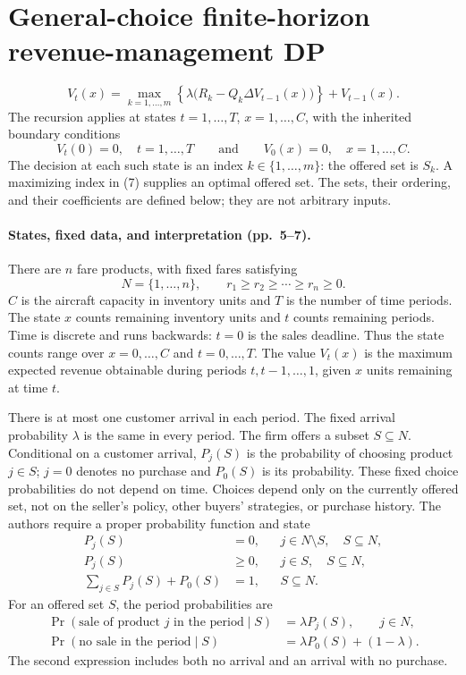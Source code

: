 \documentclass{article}
\begin{document}
\section*{General-choice finite-horizon revenue-management DP}

\begin{equation}
V_t(x)=\max_{k=1,\ldots,m}
\left\{\lambda\bigl(R_k-Q_k\Delta V_{t-1}(x)\bigr)\right\}
+V_{t-1}(x).
\tag{7}
\end{equation}
The recursion applies at states $t=1,\ldots,T$, $x=1,\ldots,C$, with the inherited boundary conditions
\begin{equation}
V_t(0)=0,\quad t=1,\ldots,T
\qquad\text{and}\qquad
V_0(x)=0,\quad x=1,\ldots,C.
\tag{2}
\end{equation}
The decision at each such state is an index $k\in\{1,\ldots,m\}$: the offered set is $S_k$. A maximizing index in (7) supplies an optimal offered set. The sets, their ordering, and their coefficients are defined below; they are not arbitrary inputs.

\paragraph{States, fixed data, and interpretation (pp.~5--7).}
There are $n$ fare products, with fixed fares satisfying
\[
N=\{1,\ldots,n\},
\qquad r_1\ge r_2\ge\cdots\ge r_n\ge0.
\]
$C$ is the aircraft capacity in inventory units and $T$ is the number of time periods. The state $x$ counts remaining inventory units and $t$ counts remaining periods. Time is discrete and runs backwards: $t=0$ is the sales deadline. Thus the state counts range over $x=0,\ldots,C$ and $t=0,\ldots,T$. The value $V_t(x)$ is the maximum expected revenue obtainable during periods $t,t-1,\ldots,1$, given $x$ units remaining at time $t$.

There is at most one customer arrival in each period. The fixed arrival probability $\lambda$ is the same in every period. The firm offers a subset $S\subseteq N$. Conditional on a customer arrival, $P_j(S)$ is the probability of choosing product $j\in S$; $j=0$ denotes no purchase and $P_0(S)$ is its probability. These fixed choice probabilities do not depend on time. Choices depend only on the currently offered set, not on the seller's policy, other buyers' strategies, or purchase history. The authors require a proper probability function and state
\begin{align*}
P_j(S)&=0,
&&j\in N\setminus S,\quad S\subseteq N,\\
P_j(S)&\ge0,
&&j\in S,\quad S\subseteq N,\\
\sum_{j\in S}P_j(S)+P_0(S)&=1,
&&S\subseteq N.
\end{align*}
For an offered set $S$, the period probabilities are
\begin{align*}
\Pr(\text{sale of product }j\text{ in the period}\mid S)
&=\lambda P_j(S),\qquad j\in N,\\
\Pr(\text{no sale in the period}\mid S)
&=\lambda P_0(S)+(1-\lambda).
\end{align*}
The second expression includes both no arrival and an arrival with no purchase.
\end{document}
